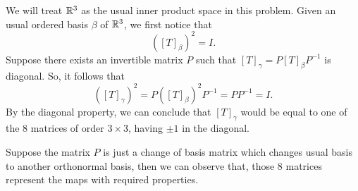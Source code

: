 \documentclass[11pt, a4paper, abstract=true]{scrartcl}
\begin{document}
\begin{soln}
    We will treat \(\mathbb R^3\) as the usual inner product space in this problem.
    Given an usual ordered basis \(\beta\) of \(\mathbb R^3\), we first notice that \[([T]_{\beta})^2= I.\] Suppose there exists an invertible matrix \(P\) such that \([T]_{\gamma} = P[T]_{\beta}P^{-1}\) is diagonal. So, it follows that \[([T]_{\gamma})^2 = P([T]_{\beta})^2 P^{-1} = PP^{-1} = I.\] By the diagonal property, we can conclude that \([T]_{\gamma}\) would be equal to one of the \(8\) matrices of order \(3 \times 3\), having \(\pm 1\) in the diagonal.

    Suppose the matrix \(P\) is just a change of basis matrix which changes usual basis to another orthonormal basis, then we can observe that, those 8 matrices represent the maps with required properties.


\end{soln}
\end{document}
